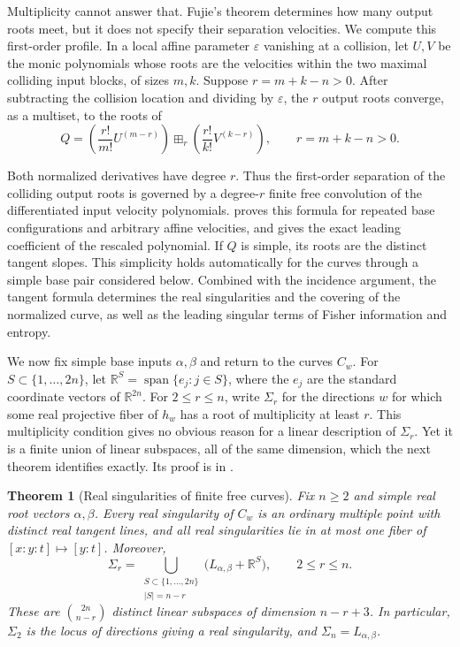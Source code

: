 \documentclass[12pt,reqno]{amsart}
\newtheorem{theorem}{Theorem}[section]
\theoremstyle{definition}
\theoremstyle{remark}
\newcommand{\R}{\mathbb R}
\begin{document}
Multiplicity cannot answer that. Fujie's theorem determines how many
output roots meet, but it does not specify their separation velocities.
We compute this first-order profile.  In a local affine parameter
\(\varepsilon\) vanishing at a collision, let \(U,V\) be the monic
polynomials whose roots are the velocities within the two maximal colliding input blocks, of sizes \(m,k\).  Suppose \(r=m+k-n>0\).
After subtracting the collision location and dividing by \(\varepsilon\),
the \(r\) output roots converge, as a multiset, to the roots of
\begin{equation}\label{eq:intro-tangent-convolution}
 Q=
 \left(\frac{r!}{m!}U^{(m-r)}\right)
 \boxplus_r
 \left(\frac{r!}{k!}V^{(k-r)}\right),
 \qquad r=m+k-n>0.
\end{equation}

Both normalized derivatives have degree \(r\). Thus the first-order
separation of the colliding output roots is governed by a
degree-\(r\) finite free convolution of the differentiated input
velocity polynomials.  proves this
formula for repeated base configurations and arbitrary affine
velocities, and gives the exact leading coefficient of the
rescaled polynomial. If \(Q\) is simple, its roots are the distinct
tangent slopes. This simplicity holds automatically for the curves
through a simple base pair considered below. Combined with the incidence argument, the tangent formula determines the real singularities and the covering of the normalized curve, as well as the leading singular terms of Fisher
information and entropy.

We now fix simple base inputs \(\alpha,\beta\) and return to the
curves \(C_w\).  For \(S\subset\{1,\ldots,2n\}\), let
\(\R^S=\operatorname{span}\{e_j:j\in S\}\), where the \(e_j\)
are the standard coordinate vectors of \(\R^{2n}\).  For
\(2\leq r\leq n\), write \(\Sigma_r\) for the directions \(w\)
for which some real projective fiber of \(h_w\) has a root of
multiplicity at least \(r\).  This multiplicity condition gives no
obvious reason for a linear description of \(\Sigma_r\).  Yet it is
a finite union of linear subspaces, all of the same dimension, which
the next theorem identifies exactly.  Its proof is in
.

\begin{theorem}[Real singularities of finite free curves]
\label{thm:intro-real-geometry}
Fix \(n\geq2\) and simple real root vectors \(\alpha,\beta\).
Every real singularity of \(C_w\) is an ordinary multiple point with
distinct real tangent lines, and all real singularities lie in at most
one fiber of \([x:y:t]\mapsto[y:t]\).  Moreover,
\begin{equation}\label{eq:intro-collision-arrangement}
 \Sigma_r=
 \bigcup_{\substack{S\subset\{1,\ldots,2n\}\\|S|=n-r}}
 \bigl(L_{\alpha,\beta}+\R^S\bigr),
 \qquad 2\leq r\leq n.
\end{equation}
These are \(\binom{2n}{n-r}\) distinct linear subspaces of dimension
\(n-r+3\).  In particular, \(\Sigma_2\) is the locus of directions
giving a real singularity, and \(\Sigma_n=L_{\alpha,\beta}\).
\end{theorem}
\end{document}
